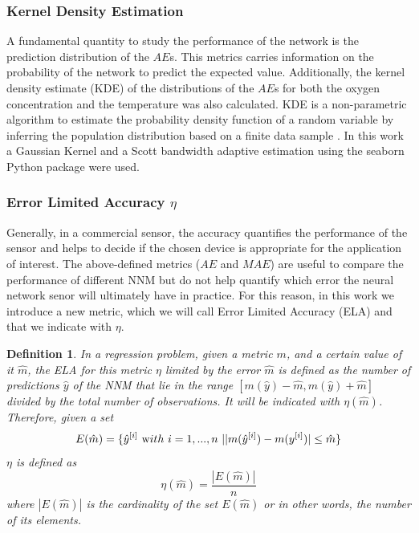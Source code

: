 \documentclass[9pt,twocolumn,twoside,pdftex]{optica}
\newtheorem*{definition*}{Definition}
\begin{document}
\subsubsection{Kernel Density Estimation}

A fundamental quantity to study the performance of the network is the prediction distribution of the $AE$s. This metrics carries information on the probability of the network to predict the expected value. Additionally, the kernel density estimate (KDE) of the distributions of the $AE$s for both the oxygen concentration and the temperature was also calculated. KDE is a non-parametric algorithm to estimate the probability density function of a random variable by inferring the population distribution based on a finite data sample \cite{Hastie2009}.  In this work a Gaussian Kernel and a Scott bandwidth adaptive estimation \cite{Sain1996} using the seaborn Python package \cite{Waskom2020} were used.


\subsubsection{Error Limited Accuracy $\eta$}
\label{sektion:ela}

Generally, in a commercial sensor, the accuracy quantifies the performance of the sensor and helps to decide if the chosen device is appropriate for the application of interest. The above-defined metrics ($AE$ and $MAE$) are useful to compare the performance of different NNM but do not help quantify which error the neural network senor will ultimately have in practice.
For this reason, in this work we introduce a new metric, which we will call Error Limited Accuracy (ELA) and that we indicate with $\eta$.

\begin{definition*}
In a regression problem, given a metric $m$, and a certain value of it $\hat m$, the ELA for this metric $\eta$ limited by the error $\hat m$ is defined as the number of predictions $\hat y$ of the NNM that lie in the range $[m(\hat y)-\hat m, m(\hat y)+\hat m]$ divided by the total number of observations. It will be indicated with $\eta(\hat m)$. Therefore, given a set
\begin{equation}
E(\hat m) = \{ \hat y^{[i]} \ {\text with } \ i = 1,..., n\ | |m(\hat y^{[i]})-m(y^{[i]})|\leq \hat m \} 
\end{equation}
$\eta$ is defined as
\begin{equation}
\eta(\hat m) = \frac{|E(\hat m)|}{n}
\end{equation}
where $|E(\hat m)|$ is the cardinality of the set $E(\hat m)$ or in other words, the number of its elements.
\end{definition*}
\end{document}
